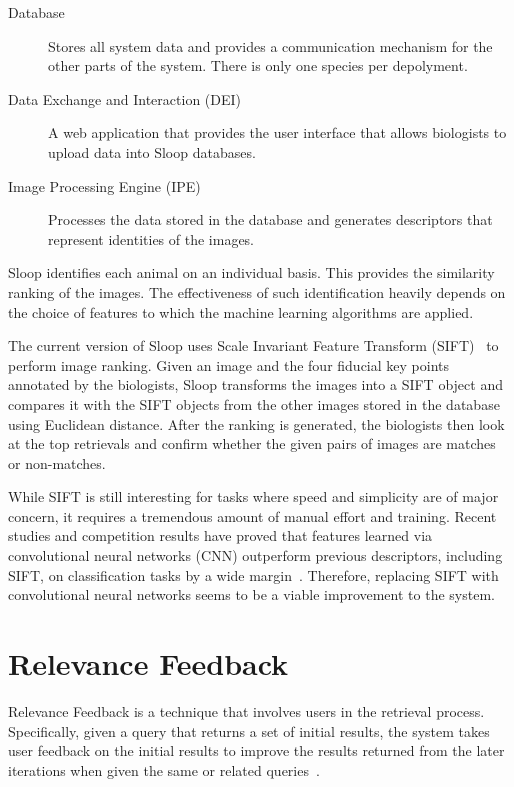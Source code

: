 \begin{description}
    \item[Database] Stores all system data and provides a communication
        mechanism for the other parts of the system. There is only one species
        per depolyment.
    \item[Data Exchange and Interaction (DEI)]
    A web application that provides the user interface that allows
    biologists to upload data into Sloop databases.
    \item[Image Processing Engine (IPE)]
    Processes the data stored in the database and generates descriptors
    that represent identities of the images.
\end{description}

Sloop identifies each animal on an individual basis. This provides the similarity
ranking of the images. The effectiveness of such identification heavily
depends on the choice of features to which the machine learning algorithms are
applied.

The current version of Sloop uses Scale Invariant Feature Transform (SIFT)~\cite{lowe04} to
perform image ranking. Given an image and the four fiducial key points
annotated by the biologists, Sloop transforms the images into a SIFT object and
compares it with the SIFT objects from the other images stored in the database using
Euclidean distance. After the ranking is generated, the biologists then look at
the top retrievals and confirm whether the given pairs of images are matches or
non-matches.

While SIFT is still interesting for tasks where speed and simplicity are of
major concern, it requires a tremendous amount of manual effort and training.
Recent studies and competition results have proved that features learned via
convolutional neural networks (CNN) outperform previous descriptors, including
SIFT, on classification tasks by a wide margin~\cite{fisher14}. Therefore,
replacing SIFT with convolutional neural networks seems to be a viable
improvement to the system.

\section{Relevance Feedback}

Relevance Feedback is a technique that involves users in the retrieval process.
Specifically, given a query that returns a set of initial results, the system
takes user feedback on the initial results to improve the results returned from
the later iterations when given the same or related
queries~\cite{manning2008introduction}.

